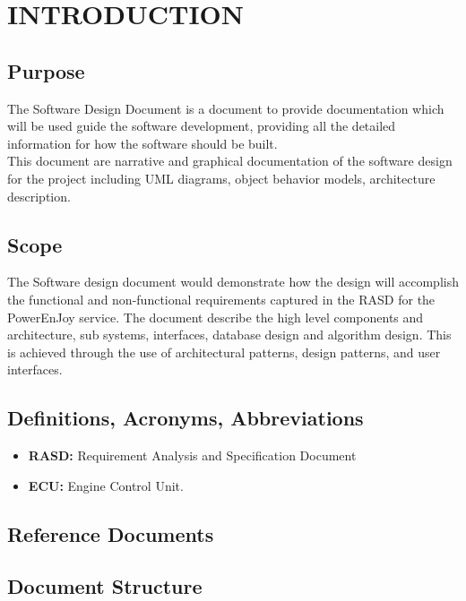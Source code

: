 \section{INTRODUCTION}
\subsection{Purpose}
The Software Design Document is a document to provide documentation which will be used guide the software development, providing all the detailed information for how the software should be built.\\
This document are narrative and graphical documentation of the software design for the project including UML diagrams, object behavior models, architecture description.
\subsection{Scope}
The Software design document would demonstrate how the design will accomplish the functional and non-functional requirements captured in the RASD for the PowerEnJoy service.
The document describe the high level components and architecture, sub systems, interfaces, database design and algorithm design. This is achieved through the use of architectural patterns, design patterns, and user interfaces. 
\subsection{Definitions, Acronyms, Abbreviations}
\begin{itemize}
	\item \textbf{RASD:} Requirement Analysis and Specification Document
	\item \textbf{ECU:} Engine Control Unit.

\end{itemize}
\subsection{Reference Documents}

\subsection{Document Structure }



\newpage